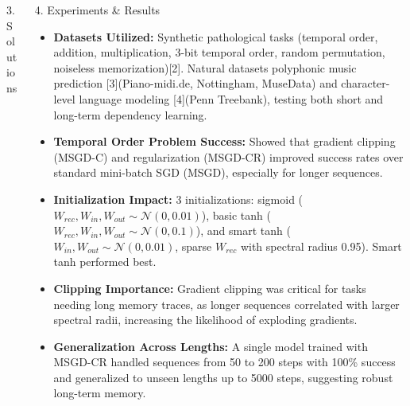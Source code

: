 \documentclass[final]{beamer}
\begin{document}
\begin{frame}[t]
\begin{columns}[t,totalwidth=\textwidth]
\begin{column}{0.3\textwidth}
\begin{block}{3. Solutions }
\begin{itemize}
        \end{itemize}
    \end{block}
\end{column}

    \begin{column}{0.3\textwidth}
    \begin{block}{4. Experiments \& Results}

    \begin{itemize} 
    \item \justifying \textbf{Datasets Utilized:} Synthetic pathological tasks (temporal order, addition, multiplication, 3-bit temporal order, random permutation, noiseless memorization)[2]. Natural datasets polyphonic music prediction [3](Piano-midi.de, Nottingham, MuseData) and character-level language modeling [4](Penn Treebank), testing both short and long-term dependency learning. 

    \item \justifying \textbf{Temporal Order Problem Success:} Showed that gradient clipping (MSGD-C) and regularization (MSGD-CR) improved success rates over standard mini-batch SGD (MSGD), especially for longer sequences. 

    \item \justifying \textbf{Initialization Impact:} 3 initializations: sigmoid ($W_{rec},W_{in},W_{out} \sim \mathcal{N}(0, 0.01)$), basic tanh ($W_{rec},W_{in},W_{out} \sim \mathcal{N}(0, 0.1)$), and smart tanh ($W_{in},W_{out} \sim \mathcal{N}(0, 0.01)$, sparse $W_{rec}$ with spectral radius 0.95). Smart tanh performed best.

    \item \justifying \textbf{Clipping Importance:} Gradient clipping was critical for tasks needing long memory traces, as longer sequences correlated with larger spectral radii, increasing the likelihood of exploding gradients. 

    \item \justifying \textbf{Generalization Across Lengths:} A single model trained with MSGD-CR handled sequences from 50 to 200 steps with 100\% success and generalized to unseen lengths up to 5000 steps, suggesting robust long-term memory.


\end{itemize}
\end{block}
\end{column}
\end{columns}
\end{frame}
\end{document}
